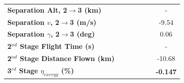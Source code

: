 \begin{table}[ht]
\begin{tabular}{l c c c c c c}
		\textbf{Separation Alt, 2$\rightarrow$3 (km)}
		& \secondthirdSeparationAltmSPARTANNinetyFiveNoReturn
		& \secondthirdSeparationAltmSPARTANNinetySevenFiveNoReturn
		& \secondthirdSeparationAltmSPARTANStandardNoReturn
		& \secondthirdSeparationAltmSPARTANOneHundredTwoFiveNoReturn
		& \secondthirdSeparationAltmSPARTANOneHundredFiveNoReturn
		& -
		\\
		\textbf{Separation $v$, 2$\rightarrow$3 (m/s)}
		& \secondthirdSeparationvmSPARTANNinetyFiveNoReturn
		& \secondthirdSeparationvmSPARTANNinetySevenFiveNoReturn
		& \secondthirdSeparationvmSPARTANStandardNoReturn
		& \secondthirdSeparationvmSPARTANOneHundredTwoFiveNoReturn
		& \secondthirdSeparationvmSPARTANOneHundredFiveNoReturn
		&-9.54
		\\
		\textbf{Separation $\gamma$, 2$\rightarrow$3 (deg)}
		& \secondthirdSeparationgammamSPARTANNinetyFiveNoReturn
		& \secondthirdSeparationgammamSPARTANNinetySevenFiveNoReturn
		& \secondthirdSeparationgammamSPARTANStandardNoReturn
		& \secondthirdSeparationgammamSPARTANOneHundredTwoFiveNoReturn
		& \secondthirdSeparationgammamSPARTANOneHundredFiveNoReturn
		&0.06
		\\
		\textbf{2$^{nd}$ Stage Flight Time (s)}
		& \secondFlightTimemSPARTANNinetyFiveNoReturn
		& \secondFlightTimemSPARTANNinetySevenFiveNoReturn
		& \secondFlightTimemSPARTANStandardNoReturn
		& \secondFlightTimemSPARTANOneHundredTwoFiveNoReturn
		& \secondFlightTimemSPARTANOneHundredFiveNoReturn
		& -
		\\
		\textbf{2$^{nd}$ Stage Distance Flown (km)}
		& \SecondDistmSPARTANNinetyFiveNoReturn
		& \SecondDistmSPARTANNinetySevenFiveNoReturn
		& \SecondDistmSPARTANStandardNoReturn
		& \SecondDistmSPARTANOneHundredTwoFiveNoReturn
		& \SecondDistmSPARTANOneHundredFiveNoReturn
		&-10.68
		\\
		\hline 
		\textbf{3$^{rd}$ Stage $\eta_{exergy}$ (\%)}
		& \textbf{\thirddExergyEffmSPARTANNinetyFiveNoReturn}
		& \textbf{\thirddExergyEffmSPARTANNinetySevenFiveNoReturn}
		& \textbf{\thirddExergyEffmSPARTANStandardNoReturn}
		& \textbf{\thirddExergyEffmSPARTANOneHundredTwoFiveNoReturn}
		& \textbf{\thirddExergyEffmSPARTANOneHundredFiveNoReturn}
		& \textbf{-0.147}
		\\
	

\end{tabular}
\end{table}
